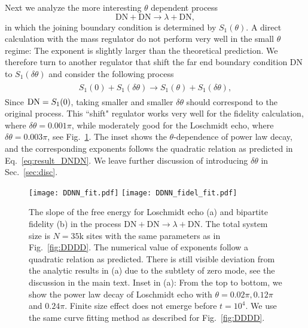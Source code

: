 Next we analyze the more interesting $\theta$ dependent process
\begin{equation}
  \text{DN}+\text{DN}\rightarrow\lambda+\text{DN},
\end{equation}
in which the joining boundary condition is determined by $S_1(\theta)$. A direct calculation with the mass regulator do not perform very well in the small $\theta$ regime: The exponent is slightly larger than the theoretical prediction. We therefore turn to another regulator that shift the far end boundary condition DN to $S_1( \delta \theta )$ and consider the following process
\begin{eqnarray}\begin{aligned}
\label{eq:approx_DNDN}
S_1(0)+S_1(\delta\theta)\rightarrow S_1(\theta)+S_1(\delta\theta),
\end{aligned}\end{eqnarray}
Since ${\rm DN} = S_1 (0 )$, taking smaller and smaller $\delta \theta$ should correspond to the original process. This ``shift" regulator works very well for the fidelity calculation, where $\delta \theta = 0.001 \pi$, while moderately good for the Loschmidt echo, where $\delta \theta = 0.003\pi$, see Fig.~\ref{fig:DDNN}. The inset shows the $\theta$-dependence of power law decay, and the corresponding exponents follows the quadratic relation as predicted in Eq.~\eqref{eq:result_DNDN}. We leave further discussion of introducing $\delta\theta$ in Sec.~\ref{sec:disc}. 

\begin{figure}
  \centering
\texttt{[image: DDNN\_fit.pdf]}
\texttt{[image: DDNN\_fidel\_fit.pdf]}
    \caption{The slope of the free energy for Loschmidt echo (a) and bipartite fidelity (b) in the process $\text{DN}+\text{DN}\rightarrow\lambda+\text{DN}$. The total system size is $N=35$k sites with the same parameters as in Fig.~\ref{fig:DDDD}. The numerical value of exponents follow a quadratic relation as predicted. There is still visible deviation from the analytic results in (a) due to the subtlety of zero mode, see the discussion in the main text. Inset in (a): From the top to bottom, we show the power law decay of Loschmidt echo with $\theta=0.02\pi, 0.12\pi $ and $0.24\pi$. Finite size effect does not emerge before $t=10^{4}$. We use the same curve fitting method as described for Fig.~\ref{fig:DDDD}.}
      \label{fig:DDNN}
\end{figure}

